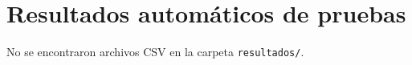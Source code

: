 \section{Resultados automáticos de pruebas}
\label{sec:resultados-automaticos}
No se encontraron archivos CSV en la carpeta \texttt{resultados/}.
